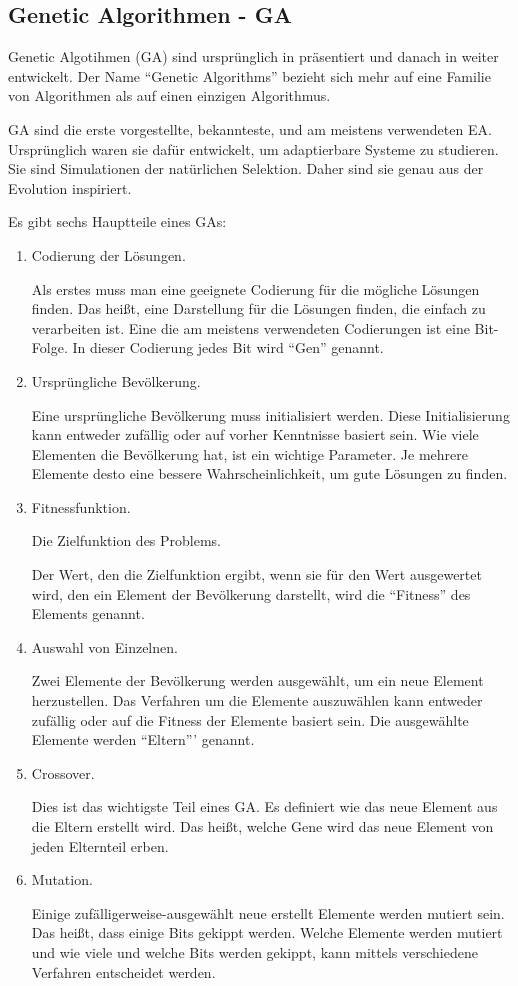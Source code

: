 \documentclass[twoside,twocolumn]{article}
\begin{document}
\subsection{Genetic Algorithmen - GA}
Genetic Algotihmen (GA) sind ursprünglich in \cite{holland_ga} präsentiert und danach in \cite{goldberg_ga} weiter entwickelt. Der Name \enquote{Genetic Algorithms} bezieht sich mehr auf eine Familie von Algorithmen als auf einen einzigen Algorithmus.\par
GA sind die erste vorgestellte, bekannteste, und am meistens verwendeten EA. Ursprünglich waren sie dafür entwickelt, um adaptierbare Systeme zu studieren. Sie sind Simulationen der natürlichen Selektion. Daher sind sie genau aus der Evolution inspiriert.\par
Es gibt sechs Hauptteile eines GAs:

\begin{enumerate}
\item{Codierung der Lösungen.}\par
Als erstes muss man eine geeignete Codierung für die mögliche Lösungen finden. Das heißt, eine Darstellung für die Lösungen finden, die einfach zu verarbeiten ist. Eine die am meistens verwendeten Codierungen ist eine Bit-Folge. In dieser Codierung jedes Bit wird \enquote{Gen} genannt.
\item{Ursprüngliche Bevölkerung.}\par
Eine ursprüngliche Bevölkerung muss initialisiert werden. Diese Initialisierung kann entweder zufällig oder auf vorher Kenntnisse basiert sein. Wie viele Elementen die Bevölkerung hat, ist ein wichtige Parameter. Je mehrere Elemente desto eine bessere Wahrscheinlichkeit, um gute Lösungen zu finden.
\item{Fitnessfunktion.}\par
Die Zielfunktion des Problems.\par
Der Wert, den die Zielfunktion ergibt, wenn sie für den Wert ausgewertet wird, den ein Element der Bevölkerung darstellt, wird die \enquote{Fitness} des Elements genannt.
\item{Auswahl von Einzelnen.}\par
Zwei Elemente der Bevölkerung werden ausgewählt, um ein neue Element herzustellen. Das Verfahren um die Elemente auszuwählen kann entweder zufällig oder auf die Fitness der Elemente basiert sein. Die ausgewählte Elemente werden \enquote{Eltern}' genannt.
\item{Crossover.}\par
Dies ist das wichtigste Teil eines GA. Es definiert wie das neue Element aus die Eltern erstellt wird. Das heißt, welche Gene wird das neue Element von jeden Elternteil erben.
\item{Mutation.}\par
Einige zufälligerweise-ausgewählt neue erstellt Elemente werden mutiert sein. Das heißt, dass einige Bits gekippt werden. Welche Elemente werden mutiert und wie viele und welche Bits werden gekippt, kann mittels verschiedene Verfahren entscheidet werden.
\end{enumerate}
\end{document}
